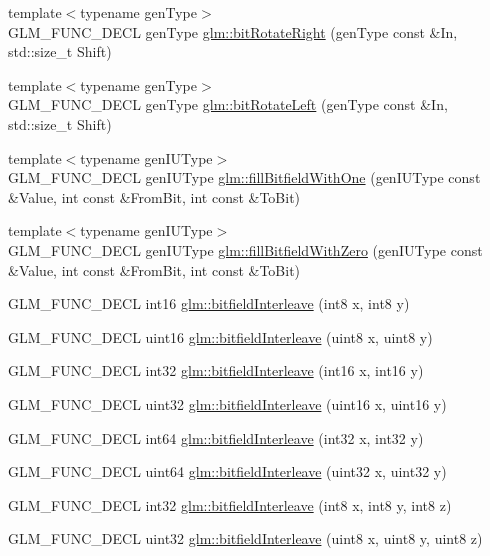 \begin{CompactItemize}
{\footnotesize template$<$typename genType$>$ }\\GLM\_\-FUNC\_\-DECL genType \hyperlink{group__gtx__bit_g01a6893d9fa57a4df1f6f7b0d399268d}{glm::bitRotateRight} (genType const \&In, std::size\_\-t Shift)
\item 
{\footnotesize template$<$typename genType$>$ }\\GLM\_\-FUNC\_\-DECL genType \hyperlink{group__gtx__bit_g4cd980832ab9c35c73f8c76b8f309c92}{glm::bitRotateLeft} (genType const \&In, std::size\_\-t Shift)
\item 
{\footnotesize template$<$typename genIUType$>$ }\\GLM\_\-FUNC\_\-DECL genIUType \hyperlink{group__gtx__bit_g98140d04738cfe05d70f090a7f1151f9}{glm::fillBitfieldWithOne} (genIUType const \&Value, int const \&FromBit, int const \&ToBit)
\item 
{\footnotesize template$<$typename genIUType$>$ }\\GLM\_\-FUNC\_\-DECL genIUType \hyperlink{group__gtx__bit_gd7bf903dae07525ab89be5a3cad616a7}{glm::fillBitfieldWithZero} (genIUType const \&Value, int const \&FromBit, int const \&ToBit)
\item 
GLM\_\-FUNC\_\-DECL int16 \hyperlink{group__gtx__bit_g479134317bc95d99f2b2e235d3db287b}{glm::bitfieldInterleave} (int8 x, int8 y)
\item 
GLM\_\-FUNC\_\-DECL uint16 \hyperlink{group__gtx__bit_g0700a3ceb088a0ecc23d76c154096061}{glm::bitfieldInterleave} (uint8 x, uint8 y)
\item 
GLM\_\-FUNC\_\-DECL int32 \hyperlink{group__gtx__bit_g1a0264598647ae00a596865af4e1e878}{glm::bitfieldInterleave} (int16 x, int16 y)
\item 
GLM\_\-FUNC\_\-DECL uint32 \hyperlink{group__gtx__bit_g19ef8360379483e3ee245e89cb62ff93}{glm::bitfieldInterleave} (uint16 x, uint16 y)
\item 
GLM\_\-FUNC\_\-DECL int64 \hyperlink{group__gtx__bit_g0de51d5985e6a703f305a5a61479babd}{glm::bitfieldInterleave} (int32 x, int32 y)
\item 
GLM\_\-FUNC\_\-DECL uint64 \hyperlink{group__gtx__bit_g2bc87fd66f6f8471c1a46888360cef12}{glm::bitfieldInterleave} (uint32 x, uint32 y)
\item 
GLM\_\-FUNC\_\-DECL int32 \hyperlink{group__gtx__bit_g6dee2ce1c45805063bb7fc5f6fd8f5ca}{glm::bitfieldInterleave} (int8 x, int8 y, int8 z)
\item 
GLM\_\-FUNC\_\-DECL uint32 \hyperlink{group__gtx__bit_gb9d593a2e916beb8f8137a0dbeae3afe}{glm::bitfieldInterleave} (uint8 x, uint8 y, uint8 z)

\end{CompactItemize}
